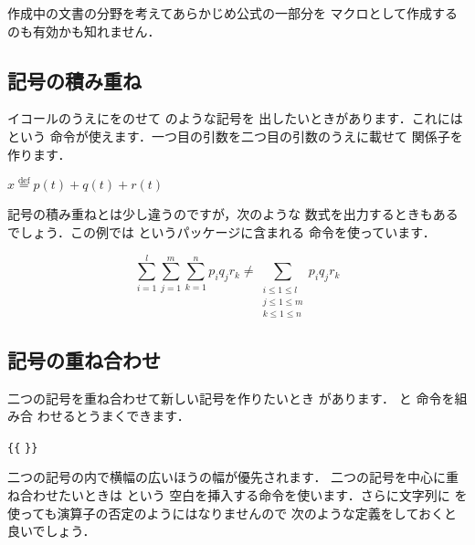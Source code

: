 作成中の文書の分野を考えてあらかじめ公式の一部分を
マクロとして作成するのも有効かも知れません．%

\subsection{記号の積み重ね}
%
イコール\qu{$=$}のうえにをのせて
のような記号を
出したいときがあります．これには  という
命令が使えます．一つ目の引数を二つ目の引数のうえに載せて
関係子を作ります．
\begin{Syntax}
\end{Syntax}
\begin{InOut}
\newcommand{\defeq}{%
   \stackrel{\mathrm{def}}{=}}
\( x \defeq p(t)+q(t)+r(t) \)
\end{InOut}
記号の積み重ねとは少し違うのですが，次のような
数式を出力するときもあるでしょう．この例では 
というパッケージに含まれる
命令を使っています．
\begin{InOut}
\begin{displaymath}
 \sum^l_{i=1} \sum^m_{j=1} \sum^n_{k=1} 
 p_i q_j r_k \neq \sum_{
 \substack{i\le 1\le l \\ j\le 1 \le m
 \\ k\le 1 \le n}} p_i q_j r_k
\end{displaymath} 
\end{InOut}

\subsection{記号の重ね合わせ}%
二つの記号を重ね合わせて新しい記号を作りたいとき
があります． と 命令を組み合
わせるとうまくできます．
\begin{Syntax}
\verb|{|\verb|{|%
 \verb|}}|
\end{Syntax}
二つの記号の内で横幅の広いほうの幅が優先されます．
二つの記号を中心に重ね合わせたいときは という
空白を挿入する命令を使います．さらに文字列に %
を使っても演算子の否定のようにはなりませんので
次のような定義をしておくと良いでしょう．

\begin{InTeX}
\newcommand{\cnot}[1]{\ooalign{／\crcr{\hss{#1}\hss}}}
\end{InTeX}

